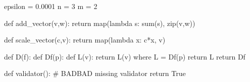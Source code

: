 \documentclass{ximera}
\begin{document}
\begin{exercise}
\begin{python}
epsilon = 0.0001
n = 3
m = 2

def add_vector(v,w):
  return map(lambda s: sum(s), zip(v,w))

def scale_vector(c,v):
  return map(lambda x: c*x, v)

def D(f):
  def Df(p):
    def L(v):
      return L(v) where L = Df(p)
    return L
  return Df

def validator():
  # BADBAD missing validator
  return True
\end{python}
\end{exercise}
\end{document}
